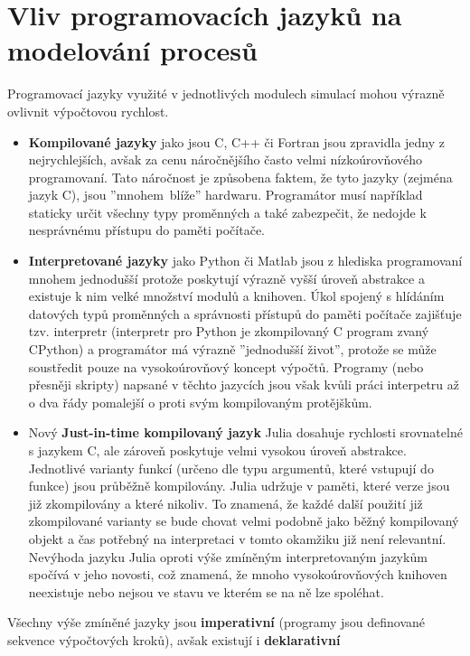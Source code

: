 \section{Vliv programovacích jazyků na modelování procesů}
\label{sec:proglang}
Programovací jazyky využité v jednotlivých modulech simulací mohou výrazně
ovlivnit výpočtovou rychlost.
\begin{itemize}
  \item
    \textbf{Kompilované jazyky} jako jsou C, C++ či Fortran jsou zpravidla
    jedny z nejrychlejších, avšak za cenu náročnějšího často velmi
    nízkoúrovňového programovaní. Tato náročnost je způsobena faktem, že tyto
    jazyky (zejména jazyk C), jsou ''mnohem~blíže'' hardwaru. Programátor musí
    například staticky určit všechny typy proměnných a také zabezpečit, že
    nedojde k nesprávnému přístupu do paměti počítače.
  \item
    \textbf{Interpretované jazyky} jako Python či Matlab jsou z hlediska
    programovaní mnohem jednodušší protože poskytují výrazně vyšší úroveň
    abstrakce a existuje k nim velké množství modulů a knihoven. Úkol spojený s
    hlídáním datových typů proměnných a správnosti přístupů do paměti počítače
    zajišťuje tzv. interpretr (interpretr pro Python je zkompilovaný C program
    zvaný CPython) a programátor má výrazně ''jednodušší život'', protože se
    může soustředit pouze na vysokoúrovňový koncept výpočtů. Programy (nebo
    přesněji skripty) napsané v těchto jazycích jsou však kvůli práci
    interpetru až o dva řády pomalejší o proti svým kompilovaným protějškům.
  \item
    Nový \textbf{Just-in-time kompilovaný jazyk} Julia \cite{julia2017}
    dosahuje rychlosti srovnatelné s jazykem C, ale zároveň poskytuje velmi
    vysokou úroveň abstrakce. Jednotlivé varianty funkcí (určeno dle typu
    argumentů, které vstupují do funkce) jsou průběžně kompilovány. Julia
    udržuje v paměti, které verze jsou již zkompilovány a které nikoliv.
    To znamená, že každé další použití již zkompilované varianty se bude chovat
    velmi podobně jako běžný kompilovaný objekt a čas potřebný na interpretaci
    v tomto okamžiku již není relevantní. Nevýhoda jazyku Julia oproti výše
    zmíněným interpretovaným jazykům spočívá v jeho novosti, což znamená, že
    mnoho vysokoúrovňových knihoven neexistuje nebo nejsou ve stavu ve kterém
    se na ně lze spoléhat.
\end{itemize}
Všechny výše zmíněné jazyky jsou \textbf{imperativní} (programy jsou definované
sekvence výpočtových kroků), avšak existují i \textbf{deklarativní}
